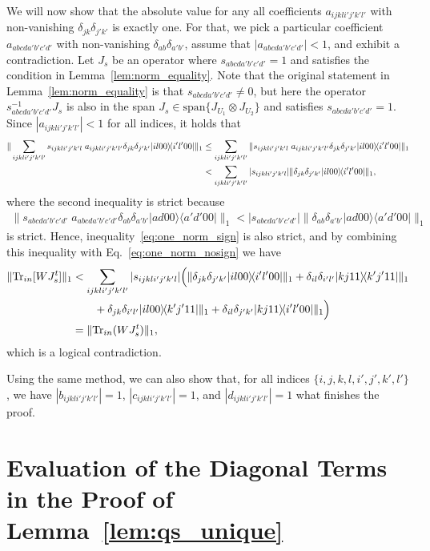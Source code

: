 \documentclass[a4paper,twocolumn,accepted=2022-10-23]{quantumarticle}
\newcommand{\ketbra}[2]{\vert {#1} \rangle\!\langle {#2} \vert}
\newcommand{\Tr}[0]{{\mathrm{Tr}}}
\theoremstyle{definition}
\begin{document}
We will now show that the absolute value for any all  coefficients $a_{ijkli'j'k'l'}$ with non-vanishing $\delta_{jk}\delta_{j'k'}$ is exactly one.
For that, we pick a particular coefficient $a_{abcda'b'c'd'}$ with non-vanishing $\delta_{ab}\delta_{a'b'}$, assume that $|a_{abcda'b'c'd'}| < 1$, and exhibit a contradiction.
Let $J_{s}$ be an operator where  $s_{abcda'b'c'd'} = 1$ and satisfies the condition in Lemma~\ref{lem:norm_equality}.
Note that the original statement in Lemma~\ref{lem:norm_equality} is that $s_{abcda'b'c'd'} \neq 0$,
but here the operator $s_{abcda'b'c'd'}^{-1} J_s$ is also in the span $J_{s} \in \mathrm{span} \{ J_{U_1} \otimes J_{U_2} \}$ and satisfies $s_{abcda'b'c'd'} =1$.
Since $|a_{ijkli'j'k'l'}| < 1$ for all indices, it holds that
\begin{align}
\| \sum_{ijkli'j'k'l'} s_{ijkli'j'k'l} \; a_{ijkli'j'k'l'} \delta_{jk}\delta_{j'k'} \ketbra{il00}{i'l'00} \|_1
&\leq \sum_{ijkli'j'k'l'} \| s_{ijkli'j'k'l} \; a_{ijkli'j'k'l'} \delta_{jk}\delta_{j'k'} \ketbra{il00}{i'l'00} \|_1 \notag \\
&< \sum_{ijkli'j'k'l'}  |s_{ijkli'j'k'l} | \| \delta_{jk}\delta_{j'k'} \ketbra{il00}{i'l'00} \|_1,
\end{align}
where the second inequality is strict because
\begin{align}
\| s_{abcda'b'c'd'} \; a_{abcda'b'c'd'} \delta_{ab} \delta_{a'b'} \ketbra{ad00}{a'd'00} \|_1 < |s_{abcda'b'c'd'} | \| \delta_{ab} \delta_{a'b'} \ketbra{ad00}{a'd'00} \|_1
\end{align}
is strict.
Hence, inequality~\eqref{eq:one_norm_sign} is also strict, and by combining this inequality with Eq.~\eqref{eq:one_norm_nosign} we have
\begin{align}
\| \Tr_{in} [W J_{s}^t] \|_1
&< \sum_{ijkli'j'k'l'}  |s_{ijkli'j'k'l} | \Big(\| \delta_{jk}\delta_{j'k'} \ketbra{il00}{i'l'00} \|_1 + \delta_{il}\delta_{i'l'} \ketbra{kj11}{k'j'11} \|_1 \notag \\
&\qquad + \delta_{jk}\delta_{i'l'} \ketbra{il00}{k'j'11} \|_1 +\delta_{il}\delta_{j'k'} \ketbra{kj11}{i'l'00} \|_1 \Big) \nonumber \\
&= \| \Tr_{in}(W J_{s}^t) \|_1,
\end{align}
which is a logical contradiction.


Using the same method, we can also show that, for all indices $\{i,j,k,l,i',j',k',l'\}$, we have $|b_{ijkli'j'k'l'}| = 1$, $|c_{ijkli'j'k'l'}| = 1$, and $|d_{ijkli'j'k'l'}| = 1$ what finishes the proof.

\section{Evaluation of the Diagonal Terms in the Proof of Lemma~\ref{lem:qs_unique}}\label{ap:diag}
\end{document}
